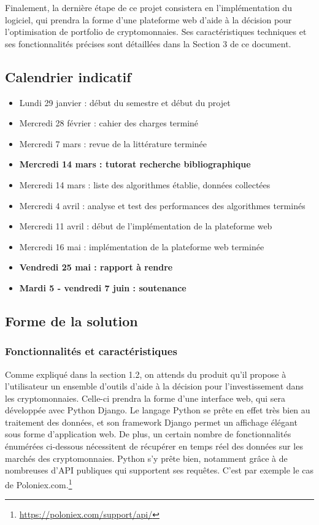 \documentclass[a4paper]{article}
\begin{document}
Finalement, la dernière étape de ce projet consistera en l'implémentation du logiciel, qui prendra la forme d’une plateforme web d’aide à la décision pour l’optimisation de portfolio de cryptomonnaies. Ses caractéristiques techniques et ses fonctionnalités précises sont détaillées dans la Section 3 de ce document.

\subsection{Calendrier indicatif}

\begin{itemize}
    \item Lundi 29 janvier : début du semestre et début du projet
    \item Mercredi 28 février : cahier des charges terminé
    \item Mercredi 7 mars : revue de la littérature terminée
    \item \textbf{Mercredi 14 mars : tutorat recherche bibliographique}
    \item Mercredi 14 mars : liste des algorithmes établie, données collectées
    \item Mercredi 4 avril : analyse et test des performances des algorithmes terminés
    \item Mercredi 11 avril : début de l'implémentation de la plateforme web
    \item Mercredi 16 mai : implémentation de la plateforme web terminée
    \item \textbf{Vendredi 25 mai : rapport à rendre}
    \item \textbf{Mardi 5 - vendredi 7 juin : soutenance}
\end{itemize}

\subsection{Forme de la solution}

\subsubsection{Fonctionnalités et caractéristiques}

Comme expliqué dans la section 1.2, on attends du produit qu'il propose à l'utilisateur un ensemble d'outils d'aide à la décision pour l'investissement dans les cryptomonnaies. Celle-ci prendra la forme d'une interface web, qui sera développée avec Python Django. Le langage Python se prête en effet très bien au traitement des données, et son framework Django permet un affichage élégant sous forme d'application web. De plus, un certain nombre de fonctionnalités énumérées ci-dessous nécessitent de récupérer en temps réel des données sur les marchés des cryptomonnaies. Python s'y prête bien, notamment grâce à de nombreuses d'API publiques qui supportent ses requêtes. C'est par exemple le cas de Poloniex.com.\footnote{\url{https://poloniex.com/support/api/}} 
\end{document}
